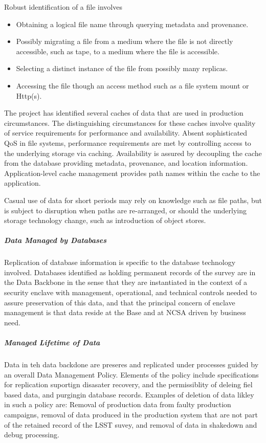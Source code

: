 Robust identification of a file involves
\begin{itemize}
\item Obtaining a logical file name through querying metadata and provenance.
\item Possibly migrating a file from a medium where the file is not directly accessible,
such as tape, to a medium where the file is accessible.
\item Selecting a distinct instance of the file from possibly many replicas.
\item Accessing the file though an access method such as a file system mount or Http(s). 
\end{itemize}

The project has identified several caches of data that are used in production circumstances.
The distinguishing circumstances for these caches involve quality of service requirements for
performance and availability. Absent sophisticated QoS in file systems, performance requirements
are met by controlling access to the underlying storage via caching. Availability is assured by
decoupling the cache from the database providing metadata, provenance, and location information.
Application-level cache management provides path names within the cache to the application.

Casual use of data for short periods may rely on knowledge such as file paths, but is subject
to disruption when paths are re-arranged, or should the underlying storage technology change, 
such as introduction of object stores.


\subparagraph{Data Managed by Databases}

Replication of database information is specific to the database technology involved.
Databases identified as holding permanent records of the survey are in the Data Backbone 
in the sense that they are instantiated in the context of a security enclave with management, 
operational, and technical controls needed to assure preservation of this data, and that the 
principal concern of enclave management is that data reside at the Base and at NCSA 
driven by business need.

\subparagraph{Managed Lifetime of Data}
Data in teh data backdone are preseres and replicated under processes
guided by an overall Data Management Policy.  Elements of the policy
include specifications for replication suportign disasater recovery,
and the permissiblity of deleing fiel based data, and purgingin
database records.  Examples of deletion of data likley in such a
policy are: Removal of production data from faulty production campaigns,
removal of data produced in the production system that are not part
of the retained record of the LSST suvey, and removal of data in
shakedown and debug processing.

